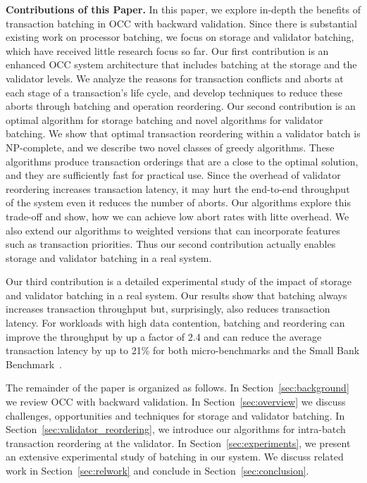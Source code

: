 {\bf Contributions of this Paper.}
In this paper, we explore in-depth the benefits of transaction batching in OCC with backward validation. Since there is substantial existing work on processor batching, we focus on storage and validator batching, which have received little research focus so far.
Our first contribution is an enhanced OCC system architecture that includes batching at the storage and the validator levels. We analyze the reasons for transaction conflicts and aborts at each stage of a transaction's life cycle, and develop techniques to reduce these aborts through batching and operation reordering.
Our second contribution is an optimal algorithm for storage batching and novel algorithms for validator batching. We show that optimal transaction reordering within a validator batch is NP-complete, and we describe two novel classes of greedy algorithms. These algorithms produce transaction orderings that are a close to the optimal solution, and they are sufficiently fast for practical use. Since the overhead of validator reordering increases transaction latency, it may hurt the end-to-end throughput of the system even it reduces the number of aborts. Our algorithms explore this trade-off and show, how we can achieve low abort rates with litte overhead. We also extend our algorithms to weighted versions that can incorporate features such as transaction priorities. Thus our second contribution actually enables storage and validator batching in a real system.



Our third contribution is a detailed experimental study of the impact of storage and validator batching in a real system. Our results show that batching always increases transaction throughput but, surprisingly, also reduces transaction latency. For workloads with high data contention, batching and reordering can improve the throughput by up a factor of 2.4 and can reduce the average transaction latency by up to 21\% for both micro-benchmarks and the Small Bank Benchmark~\cite{alomari2008icde}.

The remainder of the paper is organized as follows. In Section~\ref{sec:background}  we review OCC with backward validation. In Section~\ref{sec:overview} we discuss challenges, opportunities and techniques for storage and validator batching. In Section~\ref{sec:validator_reordering}, we introduce our algorithms for intra-batch transaction reordering at the validator. In Section~\ref{sec:experiments}, we present an extensive experimental study of batching in our system. We discuss related work in Section~\ref{sec:relwork} and conclude in Section~\ref{sec:conclusion}.

